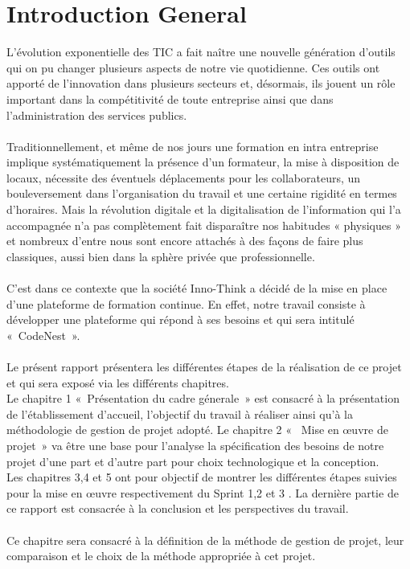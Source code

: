 \chapter*{Introduction General}
L’évolution exponentielle des TIC a fait naître une nouvelle génération d’outils qui on pu changer plusieurs aspects de notre vie quotidienne. Ces outils ont apporté de l’innovation dans plusieurs secteurs et, désormais, ils jouent un rôle important dans la
compétitivité de toute entreprise ainsi que dans l’administration des services publics.
\\
\\
Traditionnellement, et même de nos jours une formation en intra entreprise implique
systématiquement la présence d’un formateur, la mise à disposition de locaux, nécessite des
éventuels déplacements pour les collaborateurs, un bouleversement dans l’organisation du
travail et une certaine rigidité en termes d’horaires. Mais la révolution digitale et la digitalisation de l’information qui l’a accompagnée n’a pas complètement fait disparaître nos
habitudes « physiques » et nombreux d’entre nous sont encore attachés à des façons de faire plus classiques, aussi bien dans la sphère privée que professionnelle.
\\
\\C’est dans ce contexte que la société Inno-Think a décidé de la mise en place d’une plateforme de formation continue.
En effet, notre travail consiste à développer une plateforme qui répond à ses besoins et qui sera intitulé « CodeNest ».
\\
\\Le présent rapport présentera les différentes
étapes de la réalisation de ce projet et qui sera exposé via les différents chapitres.
\\Le chapitre 1 « Présentation du cadre génerale » est consacré à la présentation de l’établissement d’accueil, l’objectif du travail à réaliser ainsi qu’à la méthodologie de gestion de projet adopté.
Le chapitre 2 «  Mise en œuvre de projet » va être une base pour l’analyse la spécification des besoins de notre projet d’une part et d'autre part pour choix technologique et la conception.
\\Les chapitres 3,4 et 5 ont pour objectif de montrer les différentes étapes suivies pour la mise en œuvre respectivement du Sprint 1,2 et 3 .
La dernière partie de ce rapport est consacrée à la conclusion et les perspectives du travail.
\\
\\Ce chapitre sera consacré à la définition de la méthode de gestion de projet, leur comparaison et le choix de la méthode appropriée à cet projet. 